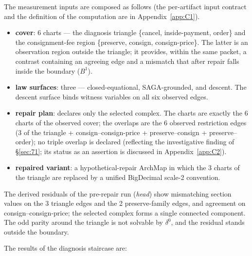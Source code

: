 The measurement inputs are composed as follows (the per-artifact input contract and
the definition of the computation are in Appendix~\ref{app:C1}).
\begin{itemize}
\item \textbf{cover}: 6 charts --- the diagnosis triangle
\{cancel, inside-payment, order\} and the consignment-fee region
\{preserve, consign, consign-price\}. The latter is an observation
region outside the triangle; it provides, within the same packet, a
contrast containing an agreeing edge and a mismatch that after repair
falls inside the boundary ($B^1$).
\item \textbf{law surfaces}: three --- closed-equational,
SAGA-grounded, and descent. The descent surface binds witness
variables on all six observed edges.
\item \textbf{repair plan}: declares only the selected complex. The
charts are exactly the 6 charts of the observed cover; the overlaps
are the 6 observed restriction edges (3 of the triangle +
consign--consign-price + preserve--consign + preserve--order); no
triple overlap is declared (reflecting the investigative finding of
\S\ref{sec:71}; its status as an assertion is discussed in
Appendix~\ref{app:C2}).
\item \textbf{repaired variant}: a hypothetical-repair ArchMap in
which the 3 charts of the triangle are replaced by a unified
BigDecimal scale-2  convention.
\end{itemize}

The derived residuals of the pre-repair run (\emph{head}) show mismatching section values on the 3
triangle edges and the 2 preserve-family edges, and agreement on
consign--consign-price; the selected complex forms a single connected
component. The odd parity around the triangle is not solvable by
$\delta^0$, and the residual stands outside the boundary.

The results of the diagnosis staircase are:

